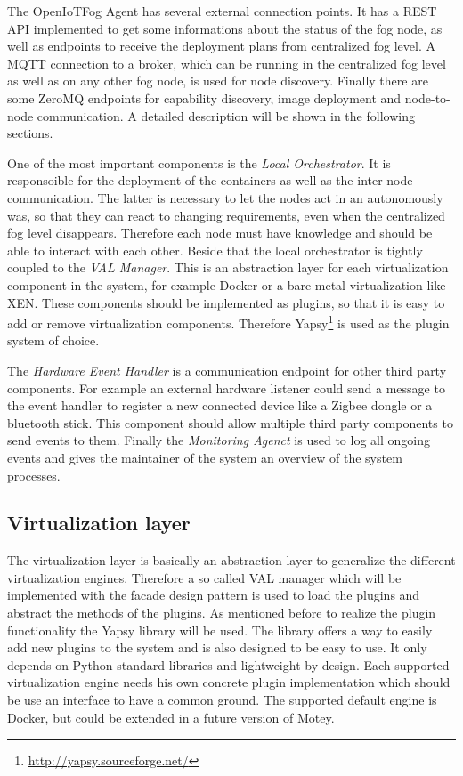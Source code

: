 The OpenIoTFog Agent has several external connection points.
It has a \ac{REST} \ac{API} implemented to get some informations about the status of the fog node, as well as endpoints to receive the deployment plans from centralized fog level.
A \ac{MQTT} connection to a broker, which can be running in the centralized fog level as well as on any other fog node, is used for node discovery.
Finally there are some ZeroMQ endpoints for capability discovery, image deployment and node-to-node communication.
A detailed description will be shown in the following sections.

One of the most important components is the \textit{Local Orchestrator}.
It is responsoible for the deployment of the containers as well as the inter-node communication.
The latter is necessary to let the nodes act in an autonomously was, so that they can react to changing requirements, even when the centralized fog level disappears.
Therefore each node must have knowledge and should be able to interact with each other.
Beside that the local orchestrator is tightly coupled to the \textit{\ac{VAL} Manager}.
This is an abstraction layer for each virtualization component in the system, for example Docker or a bare-metal virtualization like XEN.
These components should be implemented as plugins, so that it is easy to add or remove virtualization components.
Therefore Yapsy\footnote{\url{http://yapsy.sourceforge.net/}} is used as the plugin system of choice.

The \textit{Hardware Event Handler} is a communication endpoint for other third party components.
For example an external hardware listener could send a message to the event handler to register a new connected device like a Zigbee dongle or a bluetooth stick.
This component should allow multiple third party components to send events to them.
Finally the \textit{Monitoring Agenct} is used to log all ongoing events and gives the maintainer of the system an overview of the system processes.

\subsection{Virtualization layer}
The virtualization layer is basically an abstraction layer to generalize the different virtualization engines.
Therefore a so called \ac{VAL} manager which will be implemented with the facade design pattern is used to load the plugins and abstract the methods of the plugins.
As mentioned before to realize the plugin functionality the Yapsy library will be used.
The library offers a way to easily add new plugins to the system and is also designed to be easy to use.
It only depends on Python standard libraries and lightweight by design.
Each supported virtualization engine needs his own concrete plugin implementation which should be use an interface to have a common ground.
The supported default engine is Docker, but could be extended in a future version of Motey.

